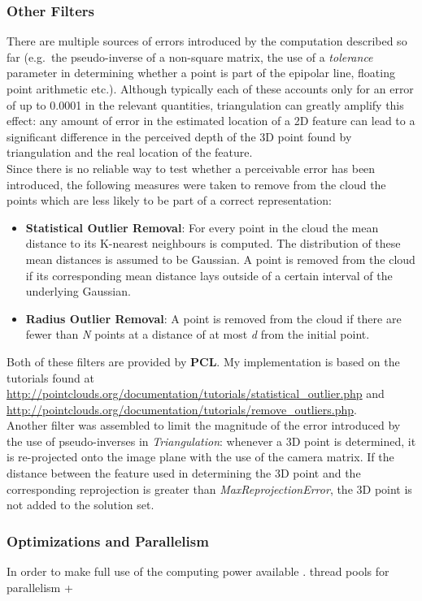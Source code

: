 \documentclass[12pt,a4paper,twoside,openright]{report}
\begin{document}
\subsubsection{Other Filters}
There are multiple sources of errors introduced by the computation described so far (e.g.\ the pseudo-inverse of a non-square matrix, the use of a \emph{tolerance} parameter in determining whether a point is part of the epipolar line, floating point arithmetic etc.). Although typically each of these accounts only for an error of up to 0.0001 in the relevant quantities, triangulation can greatly amplify this effect: any amount of error in the estimated location of a 2D feature can lead to a significant difference in the perceived depth of the 3D point found by triangulation and the real location of the feature.\\
Since there is no reliable way to test whether a perceivable error has been introduced, the following measures were taken to remove from the cloud the points which are less likely to be part of a correct representation:
\begin{itemize}
\item \textbf{Statistical Outlier Removal}: For every point in the cloud the mean distance to its K-nearest neighbours is computed. The distribution of these mean distances is assumed to be Gaussian. A point is removed from the cloud if its corresponding mean distance lays outside of a certain interval of the underlying Gaussian.  
\item \textbf{Radius Outlier Removal}: A point is removed from the cloud if there are fewer than \emph{N} points at a distance of at most \emph{d} from the initial point. 
\end{itemize}
Both of these filters are provided by \textbf{PCL}. My implementation is based on the tutorials found at \url{http://pointclouds.org/documentation/tutorials/statistical_outlier.php} and \url{http://pointclouds.org/documentation/tutorials/remove_outliers.php}.\\
\linebreak
Another filter was assembled to limit the magnitude of the error introduced by the use of pseudo-inverses in \emph{Triangulation}: whenever a 3D point is determined, it is re-projected onto the image plane with the use of the camera matrix. If the distance between the feature used in determining the 3D point and the corresponding reprojection is greater than \emph{MaxReprojectionError}, the 3D point is not added to the solution set. 

\subsubsection{Optimizations and Parallelism}
In order to make full use of the computing power available .
thread pools for parallelism + 
\end{document}
